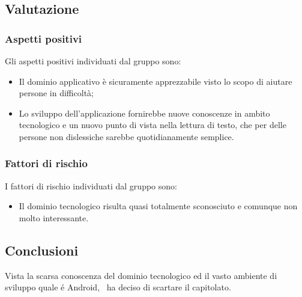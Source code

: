 \documentclass[../StudioDiFattibilita.tex]{subfiles}
\begin{document}
		\subsection{Valutazione}
			\subsubsection{Aspetti positivi}
				Gli aspetti positivi individuati dal gruppo sono:
					\begin{itemize}
						\item Il dominio applicativo è sicuramente apprezzabile visto lo scopo di aiutare persone
						in difficoltà;
						\item Lo sviluppo dell'applicazione fornirebbe nuove conoscenze in ambito tecnologico e
						un nuovo punto di vista nella lettura di testo, che per delle persone non dislessiche
						sarebbe quotidianamente semplice.
					\end{itemize}
			\subsubsection{Fattori di rischio}
				I fattori di rischio individuati dal gruppo sono:
				\begin{itemize}
					\item Il dominio tecnologico risulta quasi totalmente sconosciuto e comunque non molto
					interessante.
				\end{itemize}
			\subsection{Conclusioni}
				Vista la scarsa conoscenza del dominio tecnologico ed il vasto ambiente di sviluppo quale é
				Android, \kaleidoscode\ ha deciso di scartare il capitolato.
\end{document}
